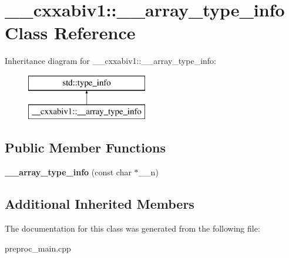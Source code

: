 \hypertarget{class____cxxabiv1_1_1____array__type__info}{\section{\+\_\+\+\_\+cxxabiv1\+:\+:\+\_\+\+\_\+array\+\_\+type\+\_\+info Class Reference}
\label{class____cxxabiv1_1_1____array__type__info}
}
Inheritance diagram for \+\_\+\+\_\+cxxabiv1\+:\+:\+\_\+\+\_\+array\+\_\+type\+\_\+info\+:\begin{figure}[H]
\begin{center}
\leavevmode
\includegraphics[height=2.000000cm]{class____cxxabiv1_1_1____array__type__info}
\end{center}
\end{figure}
\subsection*{Public Member Functions}
\begin{DoxyCompactItemize}
\item 
\hypertarget{class____cxxabiv1_1_1____array__type__info_a67c64474d97bc5c9230a94cce33d98fe}{{\bfseries \+\_\+\+\_\+array\+\_\+type\+\_\+info} (const char $\ast$\+\_\+\+\_\+n)}\label{class____cxxabiv1_1_1____array__type__info_a67c64474d97bc5c9230a94cce33d98fe}

\end{DoxyCompactItemize}
\subsection*{Additional Inherited Members}


The documentation for this class was generated from the following file\+:\begin{DoxyCompactItemize}
\item 
preproc\+\_\+main.\+cpp\end{DoxyCompactItemize}
